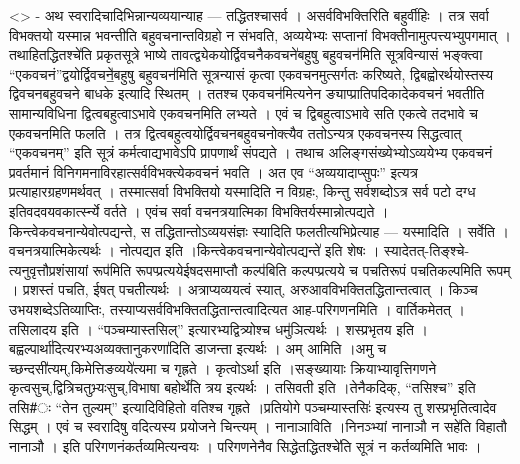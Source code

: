 \textless{}\textgreater{} - अथ स्वरादिचादिभिन्नान्यव्ययान्याह ---
तद्धितश्चासर्व । असर्वविभक्तिरिति बहुर्वीहिः । तत्र सर्वा विभक्तयो
यस्मान्न भवन्तीति बहुवचनान्तविग्रहो न संभवति, अव्ययेभ्यः सप्तानां
विभक्तीनामुत्पत्त्यभ्युपगमात् । तथाहितद्धितश्चे॑ति प्रकृतसूत्रे भाष्ये
तावत्द्व्येकयोर्द्विवचनैकवचने॑बहुषु बहुवचन॑मिति सूत्रविन्यासं भङ्क्त्वा
``एकवचनं''द्वयोर्द्विवचने॒॑बहुषु बहुवचन॑मिति सूत्रन्यासं कृत्वा
एकवचनमुत्सर्गतः करिष्यते, द्विबह्वोरर्थयोस्तस्य द्विवचनबहुवचने बाधके
इत्यादि स्थितम् । ततश्च एकवचन॑मित्यनेन ङ्याप्प्रातिपदिकादेकवचनं भवतीति
सामान्यविधिना द्वित्वबहुत्वाऽभावे एकवचनमिति लभ्यते । एवं च
द्विबहुत्वाऽभावे सति एकत्वे तदभावे च एकवचनमिति फलति । तत्र
द्वित्वबहुत्वयोर्द्विवचनबहुवचनोक्त्यैव ततोऽन्यत्र एकवचनस्य सिद्धत्वात्
``एकवचनम्'' इति सूत्रं कर्मत्वाद्यभावेऽपि प्रापणार्थं संपद्यते । तथाच
अलिङ्गसंख्येभ्योऽव्ययेभ्य एकवचनं प्रवर्तमानं
विनिगमनाविरहात्सर्वविभक्त्येकवचनं भवति । अत एव ``अव्ययादाप्सुपः''
इत्यत्र प्रत्याहारग्रहणमर्थवत् । तस्मात्सर्वा विभक्तियो यस्मादिति न
विग्रहः, किन्तु सर्वशब्दोऽत्र सर्व पटो दग्ध इतिवदवयवकार्त्स्न्ये वर्तते
। एवंच सर्वा वचनत्रयात्मिका विभक्तिर्यस्मान्नोत्पद्यते ।
किन्त्वेकवचनान्येवोत्पद्यन्ते, स तद्धितान्तोऽव्ययसंज्ञः स्यादिति
फलतीत्यभिप्रेत्याह --- यस्मादिति । सर्वेति । वचनत्रयात्मिकेत्यर्थः ।
नोत्पद्यत इति ।किन्त्वेकवचनान्येवोत्पद्यन्ते॑ इति शेषः ।
स्यादेतत्-तिङ्श्चे-त्यनुवृत्तौप्रशंसायां रूप॑मिति
रूपप्प्रत्ययेईषदसमाप्तौ कल्प॑बिति कल्पप्प्रत्यये च पचतिरूपं पचतिकल्पमिति
रूपम् । प्रशस्तं पचति, ईषत् पचतीत्यर्थः । अत्राप्यव्ययत्वं स्यात्,
अरुआवविभक्तितद्धितान्तत्वात् । किञ्च उभयशब्देऽतिव्याप्तिः,
तस्याप्यसर्वविभक्तितद्धितान्तत्वादित्यत आह-परिगणनमिति । वार्तिकमेतत् ।
तसिलादय इति । ``पञ्चम्यास्तसिल्'' इत्यारभ्यद्वित्र्योश्च धमु॑ञित्यर्थः ।
शस्प्रभृतय इति ।बह्वल्पार्था॑दित्यरभ्यअव्यक्तानुकरणा॑दिति डाजन्ता
इत्यर्थः । अम् आमिति ।अमु च च्छन्दसी॑त्यम्,किमेत्तिङव्यये॑त्यमा च
गृह्रते । कृत्वोऽर्था इति ।सङ्ख्यायाः क्रियाभ्यावृत्तिगणने
कृत्वसुच्,द्वित्रिचतुभ्र्यःसुच्,विभाषा बहोर्थे॑ति त्रय इत्यर्थः । तसिवती
इति ।तेनैकदिक्, ``तसिश्च'' इति तसि\#ः ``तेन तुल्यम्'' इत्यादिविहितो
वतिश्च गृह्रते ।प्रतियोगे पञ्चम्यास्तसिः॑ इत्यस्य तु शस्प्रभृतित्वादेव
सिद्धम् । एवं च स्वरादिषु वदित्यस्य प्रयोजने चिन्त्यम् । नानाञाविति
।निनञ्भ्यां नानाञौ न सहे॑ति विहातौ नानाञौ । इति परिगणनंकर्तव्यमित्यन्वयः
। परिगणनेनैव सिद्धेतद्धितश्चे॑ति सूत्रं न कर्तव्यमिति भावः ।
